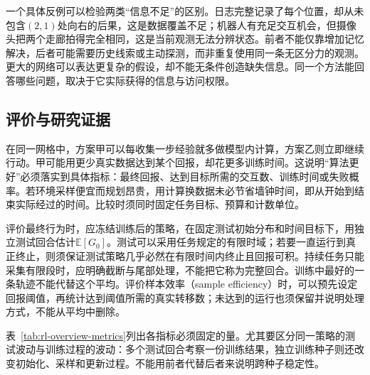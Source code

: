 一个具体反例可以检验两类“信息不足”的区别。日志完整记录了每个位置，却从未包含$(2,1)$处向右的后果，这是数据覆盖不足；机器人有充足交互机会，但摄像头把两个走廊拍得完全相同，这是当前观测无法分辨状态。前者不能仅靠增加记忆解决，后者可能需要历史线索或主动探测，而非重复使用同一条无区分力的观测。更大的网络可以表达更复杂的假设，却不能无条件创造缺失信息。同一个方法能回答哪些问题，取决于它实际获得的信息与访问权限。

\subsection{评价与研究证据}
\label{sec:rl-overview-evidence}

在同一网格中，方案甲可以每收集一步经验就多做模型内计算，方案乙则立即继续行动。甲可能用更少真实数据达到某个回报，却花更多训练时间。这说明“算法更好”必须落实到具体指标：最终回报、达到目标所需的交互数、训练时间或失败概率。若环境采样便宜而规划昂贵，用计算换数据未必节省墙钟时间，即从开始到结束实际经过的时间。比较时须同时固定任务目标、预算和计数单位。

评价最终行为时，应冻结训练后的策略，在固定测试初始分布和时间目标下，用独立测试回合估计$\mathbb E[G_0]$。测试可以采用任务规定的有限时域；若要一直运行到真正终止，则须保证测试策略几乎必然在有限时间内终止且回报可积。持续任务只能采集有限段时，应明确截断与尾部处理，不能把它称为完整回合。训练中最好的一条轨迹不能代替这个平均。评价样本效率（sample efficiency）时，可以预先设定回报阈值，再统计达到阈值所需的真实转移数；未达到的运行也须保留并说明处理方式，不能从平均中删除。

表~\ref{tab:rl-overview-metrics}列出各指标必须固定的量。尤其要区分同一策略的测试波动与训练过程的波动：多个测试回合考察一份训练结果，独立训练种子则还改变初始化、采样和更新过程。不能用前者代替后者来说明跨种子稳定性。

